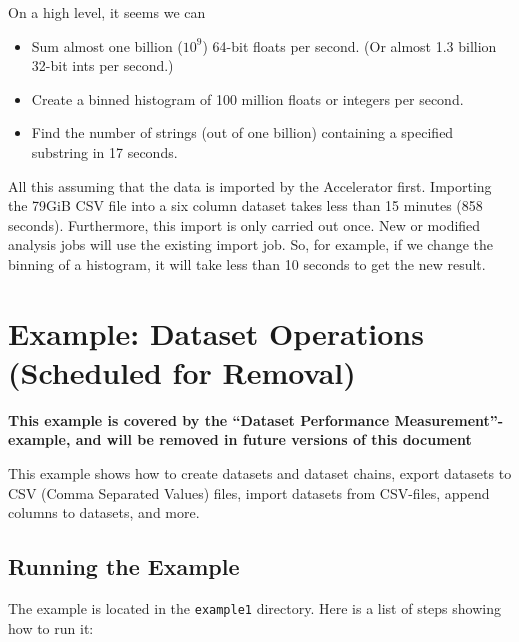 \documentclass[a4paper]{article}
\begin{document}
On a high level, it seems we can
\begin{itemize}
\item Sum almost one billion ($10^9$) 64-bit floats per second.  (Or
  almost 1.3 billion 32-bit ints per second.)
\item Create a binned histogram of 100 million floats or integers per
  second.
\item Find the number of strings (out of one billion) containing a specified substring in 17 seconds.
\end{itemize}
All this assuming that the data is imported by the Accelerator first.
Importing the 79GiB CSV file into a six column dataset takes less than
15 minutes (858 seconds).  Furthermore, this import is only carried
out once.  New or modified analysis jobs will use the existing import
job.  So, for example, if we change the binning of a histogram, it
will take less than 10 seconds to get the new result.



\clearpage
\section*{Example:  Dataset Operations (Scheduled for Removal)}

\textbf{This example is covered by the ``Dataset Performance
  Measurement''-example, and will be removed in future versions of
  this document}

This example shows how to create datasets and dataset chains, export
datasets to CSV (Comma Separated Values) files, import datasets from
CSV-files, append columns to datasets, and more.

\subsection*{Running the Example}
The example is located in the \texttt{example1} directory.  Here is a
list of steps showing how to run it:
\end{document}
